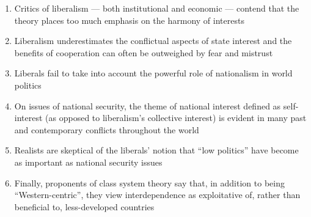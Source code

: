 \documentclass[12pt]{article}
\begin{document}
\begin{enumerate}
\begin{enumerate}
          \item Critics of liberalism — both institutional and economic — contend that the theory places too much emphasis on the harmony of interests

          \item Liberalism underestimates the conflictual aspects of state interest and the benefits of cooperation can often be outweighed by fear and mistrust

          \item Liberals fail to take into account the powerful role of nationalism in world politics

          \item On issues of national security, the theme of national interest defined as self-interest (as opposed to liberalism's collective interest) is evident in many past and contemporary conflicts throughout the world

          \item Realists are skeptical of the liberals' notion that “low politics” have become as important as national security issues

          \item Finally, proponents of class system theory say that, in addition to being “Western-centric”, they view interdependence as exploitative of, rather than beneficial to, less-developed countries

        \end{enumerate}

    \end{enumerate}
\end{document}
